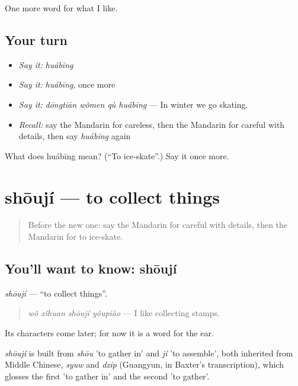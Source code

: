 \begin{grammarlens}[title={What you've built}]
One more word for what I like.
\end{grammarlens}

\subsection*{Your turn}
\begin{itemize}
\raggedright
  \item \emph{Say it:} \emph{huábīng}
  \item \emph{Say it:} \emph{huábīng}, once more
  \item \emph{Say it:} \emph{dōngtiān wǒmen qù huábīng} — In winter we go skating.
  \item \emph{Recall:} say the Mandarin for careless, then the Mandarin for careful with details, then say \emph{huábīng} again
\end{itemize}

\begin{tcolorbox}[breakable,colback=teal!4,colframe=teal!35!black,title={Before you move on}]
What does huábīng mean? (\textquotedblleft{}To ice-skate\textquotedblright{}.) Say it once more.
\end{tcolorbox}
\section[shōují]{shōují — to collect things}

\label{lesson:ZH-C274-shouji}



\begin{quote}
Before the new one: say the Mandarin for careful with details, then the Mandarin for to ice-skate.
\end{quote}

\subsection*{You'll want to know: shōují}
\emph{shōují} — \textquotedblleft{}to collect things\textquotedblright{}.

\begin{quote}
\emph{wǒ xǐhuan shōují yóupiào} — I like collecting stamps.
\end{quote}

Its characters come later; for now it is a word for the ear.

\begin{cousinweb}
\emph{shōují} is built from \emph{shōu} 'to gather in' and \emph{jí} 'to assemble', both inherited from Middle Chinese, \emph{syuw} and \emph{dzip} (Guangyun, in Baxter's transcription), which glosses the first 'to gather in' and the second 'to gather'.
\end{cousinweb}

